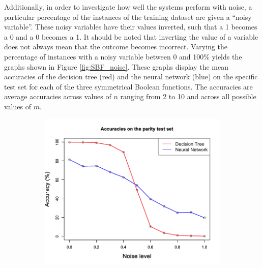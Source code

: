 \documentclass[letterpaper]{article} %
\begin{document}
Additionally, in order to investigate how well the systems perform with noise, a particular percentage of the instances of the training dataset are given a ``noisy variable''. These noisy variables have their values inverted, such that a 1 becomes a 0 and a 0 becomes a 1. It should be noted that inverting the value of a variable does not always mean that the outcome becomes incorrect. Varying the percentage of instances with a noisy variable between 0 and 100\% yields the graphs shown in Figure \ref{fig:SBF_noise}. These graphs display the mean accuracies of the decision tree (red) and the neural network (blue) on the specific test set for each of the three symmetrical Boolean functions.  The accuracies are average accuracies across values of $n$ ranging from 2 to 10 and across all possible values of $m$.


  \begin{figure}[p]
    \centering
   \begin{subfigure}[t]{0.4\textwidth}
        \centering
        \includegraphics[width = 1 \linewidth]{Figures/SBF_PU.png}
        \caption{}
        \label{fig:SBF_PU}
    \end{subfigure}%


\end{figure}
\end{document}
